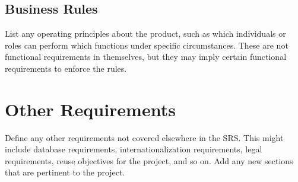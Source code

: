 \subsection*{Business Rules}
List any operating principles about the product, such as which individuals or roles can perform which functions under specific circumstances. These are not functional requirements in themselves, but they may imply certain functional requirements to enforce the rules.

\section{Other Requirements}
Define any other requirements not covered elsewhere in the SRS. This might include database requirements, internationalization requirements, legal requirements, reuse objectives for the project, and so on. Add any new sections that are pertinent to the project.